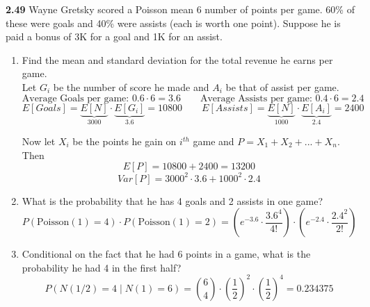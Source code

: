 \documentclass[12pt]{article}
\begin{document}
\newpage
{\bf 2.49 }Wayne Gretsky scored a Poisson mean 6 number of points per game. 60\% of these were goals and 40\% were assists (each is worth one point). Suppose he is paid a bonus of 3K for a goal and 1K for an assist.
\begin{enumerate}[label=(\alph*)]
    \item Find the mean and standard deviation for the total revenue he earns per game.\\
    
    Let $G_i$ be the number of score he made and $A_i$ be that of assist per game. 
    $$\text{Average Goals per game: }0.6\cdot 6 = 3.6 \qquad 
    \text{Average Assists per game: }0.4\cdot 6 = 2.4$$
    $$E[Goals] = \underbrace{E[N]}_{3000}\cdot \underbrace{E[G_i]}_{3.6}= 10800 \qquad
    E[Assists] = \underbrace{E[N]}_{1000}\cdot \underbrace{E[A_i]}_{2.4}= 2400    $$
    
    Now let $X_i$ be the points he gain on $i^{th}$ game and $P= X_1+X_2+...+X_n$. Then
    $$E[P] = 10800+2400 = 13200$$
    $$Var[P] = 3000^2\cdot 3.6+1000^2\cdot 2.4$$

    \item What is the probability that he has 4 goals and 2 assists in one game?
    $$P(\text{Poisson}(1)=4)\cdot P(\text{Poisson}(1)=2) 
    = \left(e^{-3.6}\cdot \frac{3.6^4}{4!}\right) \cdot \left(e^{-2.4}\cdot \frac{2.4^2}{2!}\right)$$
    \item Conditional on the fact that he had 6 points in a game, what is the probability he had 4 in the first half?
    $$P(N(1/2)=4\;|\;N(1)=6) = \binom{6}{4}\cdot \left(\frac{1}{ 2}\right)^2\cdot \left(\frac{1}{2}\right)^4 = 0.234375
    $$
\end{enumerate}
\end{document}
